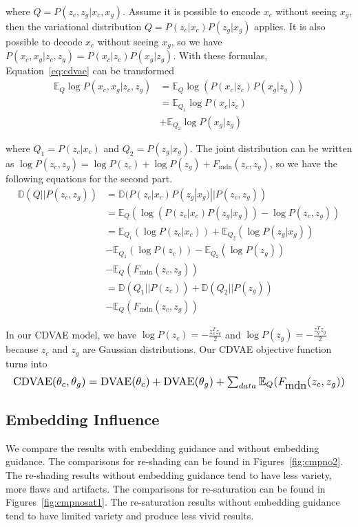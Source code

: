 \documentclass[10pt,twocolumn,letterpaper]{article}
\begin{document}
where $Q=P(z_c, z_g|x_c, x_g)$. Assume it is possible to encode $x_c$ without seeing $x_g$, then the variational distribution 
$Q=P(z_c|x_c) P(z_g|x_g)$ applies. It is also possible to decode $x_c$ without seeing $x_g$, so we have 
$P(x_c, x_g | z_c, z_g) = P(x_c | z_c) P(x_g | z_g)$. With these formulas, Equation~\ref{eq:cdvae} can be transformed
\begin{equation}
\begin{split}
\mathbb{E}_Q \log P(x_c, x_g|z_c, z_g) & = \mathbb{E}_Q \log (P(x_c|z_c)P(x_g|z_g)) \\
& = \mathbb{E}_{Q_1} \log P(x_c|z_c) \\
& + \mathbb{E}_{Q_2} \log P(x_g|z_g)
\end{split}
\end{equation}

where $Q_1=P(z_c|x_c)$ and $Q_2=P(z_g|x_g)$. The joint distribution can be written as $\log P(z_c, z_g) = \log P(z_c) + \log P(z_g) + F_{\mbox{mdn}}(z_c, z_g)$, 
so we have the following equations for the second part. 
\begin{equation}
\begin{split}
\mathbb{D}(Q || P(z_c, z_g)) & = \mathbb{D}(P(z_c|x_c) P(z_g|x_g) || P(z_c, z_g)) \\
& = \mathbb{E}_Q(\log (P(z_c|x_c) P(z_g|x_g)) - \log P(z_c, z_g)) \\
& = \mathbb{E}_{Q_1}(\log P(z_c|x_c)) + \mathbb{E}_{Q_2}(\log P(z_g|x_g)) \\
& - \mathbb{E}_{Q_1}(\log P(z_c)) - \mathbb{E}_{Q_2}(\log P(z_g)) \\
& - \mathbb{E}_Q(F_{\mbox{mdn}}(z_c, z_g)) \\
& = \mathbb{D}(Q_1 || P(z_c)) + \mathbb{D}(Q_2 || P(z_g))\\
& - \mathbb{E}_Q(F_{\mbox{mdn}}(z_c, z_g))
\end{split}
\end{equation}

In our CDVAE model, we have $\log P(z_c) = -\frac{z_c^T z_c}{2}$ and $\log P(z_g) = -\frac{z_g^T z_g}{2}$ because $z_c$ and $z_g$ are Gaussian distributions. Our
CDVAE objective function turns into
\begin{equation}
\resizebox{1.0\hsize}{!}{$ \mbox{CDVAE}(\theta_c, \theta_g) = \mbox{DVAE}(\theta_c) + \mbox{DVAE}(\theta_g) + \sum_{data} \mathbb{E}_Q(F_{\mbox{mdn}}(z_c, z_g)) $}
\end{equation}

\subsection{Embedding Influence}
We compare the results with embedding guidance and without embedding guidance. The comparisons for re-shading can be found in Figures~\ref{fig:cmpno2}. The re-shading results without embedding guidance tend to have less variety, more flaws and artifacts. 
The comparisons for re-saturation can be found in Figures~\ref{fig:cmpnosat1}. The re-saturation results without
embedding guidance tend to have limited variety and produce less vivid results. 
\end{document}
